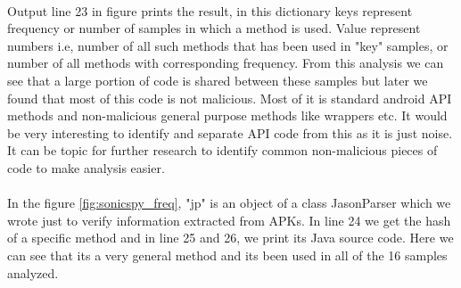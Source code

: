 \documentclass[../main.tex]{subfile}
\begin{document}
		\paragraph{} Output line 23 in figure prints the result, in this dictionary keys represent frequency or number of samples in which a method is used. Value represent numbers i.e, number of all such methods that has been used in "key" samples, or number of all methods with corresponding frequency. From this analysis we can see that a large portion of code is shared between these samples but later we found that most of this code is not malicious. Most of it is standard android API methods and non-malicious general purpose methods like wrappers etc. It would be very interesting to identify and separate API code from this as it is just noise. It can be topic for further research to identify common non-malicious pieces of code to make analysis easier. 

		\paragraph{} In the figure \ref{fig:sonicspy_freq}, "jp" is an object of a class JasonParser which we wrote just to verify information extracted from APKs. In line 24 we get the hash of a specific method and in line 25 and 26, we print its Java source code. Here we can see that its a very general method and its been used in all of the 16 samples analyzed.
		
\end{document}
